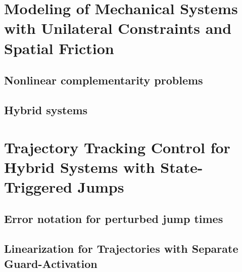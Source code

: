 \documentclass[DC2017114Bouma.tex]{subfiles}
\begin{document}
\graphicspath{{02_Material/img/}}
\cleartooddpage
\chapter{Modeling of Mechanical Systems with Unilateral Constraints and Spatial Friction}
\section{Nonlinear complementarity problems}
\section{Hybrid systems}

\cleartooddpage
\chapter{Trajectory Tracking Control for Hybrid Systems with State-Triggered Jumps}
\cite{Rijnen2017}
\section{Error notation for perturbed jump times}
\section{Linearization for Trajectories with Separate Guard-Activation}
\end{document}
